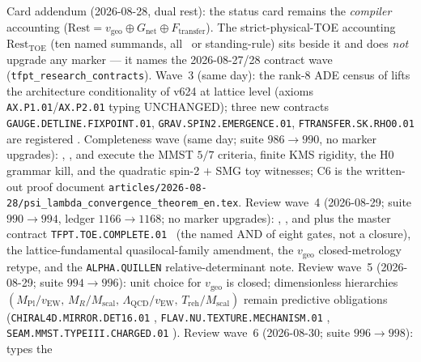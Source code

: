 \documentclass[11pt,a4paper]{article}
\begin{document}
\markerkey
\noindent Card addendum (2026-08-28, dual rest): the status card remains the \emph{compiler} accounting
($\mathrm{Rest}=v_{\mathrm{geo}}\oplus G_{\mathrm{net}}\oplus F_{\mathrm{transfer}}$).  The strict-physical-TOE
accounting $\mathrm{Rest}_{\mathrm{TOE}}$ (ten named summands, all \mO\ or standing-rule) sits beside it
and does \emph{not} upgrade any marker --- it names the 2026-08-27/28 contract wave
(\texttt{tfpt\_research\_contracts}).  Wave~3 (same day): the rank-8 ADE census of
 lifts the architecture conditionality of v624 at lattice
level (axioms \texttt{AX.P1.01}/\texttt{AX.P2.01} typing UNCHANGED); three new contracts
\texttt{GAUGE.DETLINE.FIXPOINT.01}, \texttt{GRAV.SPIN2.EMERGENCE.01},
\texttt{FTRANSFER.SK.RHO0.01} are registered \mO.
Completeness wave (same day; suite $986\to 990$, no marker upgrades):
,
,
 and
execute the MMST $5/7$ criteria, finite KMS rigidity, the H0 grammar kill, and the
quadratic spin-2 $+$ SMG toy witnesses; C6 is the written-out proof document
\texttt{articles/2026-08-28/\allowbreak psi\_lambda\_\allowbreak convergence\_\allowbreak theorem\_en.tex}.
Review wave~4 (2026-08-29; suite $990\to994$, ledger $1166\to1168$; no marker upgrades):
,
,
 and
plus the master contract \texttt{TFPT.TOE.COMPLETE.01} \mO\ (the named AND of eight
gates, not a closure), the lattice-fundamental quasilocal-family amendment, the
$v_{\mathrm{geo}}$ closed-metrology retype, and the \texttt{ALPHA.QUILLEN} relative-determinant
note.
Review wave~5 (2026-08-29; suite $994\to996$): unit choice for $v_{\mathrm{geo}}$ is closed;
dimensionless hierarchies $(M_{\mathrm{Pl}}/v_{\mathrm{EW}},\,M_R/M_{\mathrm{scal}},\,
\Lambda_{\mathrm{QCD}}/v_{\mathrm{EW}},\,T_{\mathrm{reh}}/M_{\mathrm{scal}})$ remain predictive
obligations (\texttt{CHIRAL4D.MIRROR.DET16.01} \mC, \texttt{FLAV.NU.TEXTURE.MECHANISM.01} \mO,
\texttt{SEAM.MMST.TYPEIII.CHARGED.01} \mO).
Review wave~6 (2026-08-30; suite $996\to998$):
 types the
\end{document}
